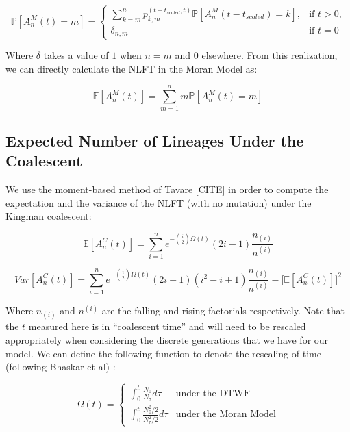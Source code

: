 \documentclass[11pt]{article}
\begin{document}
 \begin{equation*}
	 \mathbb{P}[A^M_n(t) = m] =
	 \begin{cases} 
		 \sum^n_{k=m}  p^{(t-t_{scaled}, t)}_{k,m} \mathbb{P}[A^M_n (t-t_{scaled}) = k],  &\text{if $t > 0$,}
	 	 \\
		 \delta_{n,m} &\text{if $t = 0$}
	 \end{cases}
 \end{equation*}

 Where $\delta$ takes a value of $1$ when $n=m$ and $0$ elsewhere. From this realization, we can directly calculate the NLFT in the Moran Model as:

 \begin{equation*}
	 \mathbb{E}[A^M_n(t)] = \sum^n_{m=1} m \mathbb{P}[A^M_n (t) = m]
 \end{equation*}

\subsection*{Expected Number of Lineages Under the Coalescent}

We use the moment-based method of Tavare [CITE] in order to compute the expectation and the variance of the NLFT (with no mutation) under the Kingman coalescent:

\begin{equation*}
	\mathbb{E}[A^C_n(t)] = \sum^n_{i=1} e^{-\binom{i}{2}\Omega(t)} (2i - 1) \frac{n_{(i)}}{n^{(i)}} 
\end{equation*}

\begin{equation*}
	Var[A^C_n(t)] = \sum^n_{i=1} e^{-\binom{i}{2}\Omega(t)}(2i-1)(i^2 - i + 1)\frac{n_{(i)}}{n^{(i)}} - \Bigg[\mathbb{E}[A^C_n(t)]\Bigg]^2
\end{equation*}

Where $n_{(i)}$ and $n^{(i)}$ are the falling and rising factorials respectively. Note that the $t$ measured here is in ``coalescent time'' and will need to be rescaled appropriately when considering the discrete generations that we have for our model. We can define the following function to denote the rescaling of time (following Bhaskar et al) :

\begin{equation*}
	\Omega(t) = \begin{cases}
		\int_{0}^t \frac{N_0}{N_\tau} d\tau &\text{under the DTWF}\\[2ex]
		\int_{0}^t \frac{N_0^2/2}{N_\tau^2/2} d\tau  &\text{under the Moran Model}
	\end{cases}
\end{equation*}
\end{document}
